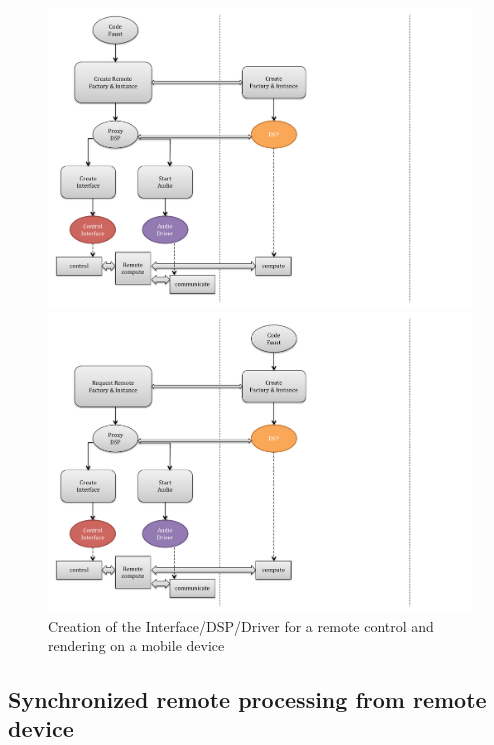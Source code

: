 \documentclass[a4paper]{article}
\begin{document}
\begin{figure}[!h]
\begin{center}
\begin{minipage}[c]{.45\linewidth}
\includegraphics[width=\columnwidth]{images/CCC61}
\end{minipage}
\begin{minipage}[r]{.45\linewidth}
\includegraphics[width=\columnwidth]{images/CCC62}
\end{minipage}
\caption{Creation of the Interface/DSP/Driver for a remote control and rendering on a mobile device}
\label{fig:CCC4}
\end{center}
\end{figure}

\subsection{Synchronized remote processing from remote device}\label{synchronizedremote}
\end{document}
